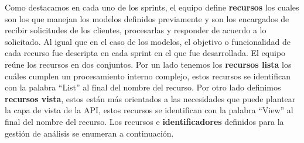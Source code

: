 \documentclass[a4paper,12pt]{article}
\begin{document}
Como destacamos en cada uno de los sprints, el equipo define \textbf{recursos} los cuales son los que manejan los modelos definidos previamente y son los encargados de recibir solicitudes de los clientes, procesarlas y responder de acuerdo a lo solicitado. Al igual que en el caso de los modelos, el objetivo o funcionalidad de cada recurso fue descripta en cada sprint en el que fue desarrollada. El equipo reúne los recursos en dos conjuntos. Por un lado tenemos los \textbf{recursos lista} los cuáles cumplen un procesamiento interno complejo, estos recursos se identifican con la palabra ``List'' al final del nombre del recurso. Por otro lado definimos \textbf{recursos vista}, estos están más orientados a las necesidades que puede plantear la capa de vista de la API, estos recursos se identifican con la palabra ``View'' al final del nombre del recurso. Los recursos e \textbf{identificadores} definidos para la gestión de análisis se enumeran a continuación.
\end{document}
